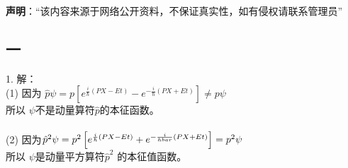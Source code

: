 
\textbf{声明}：“该内容来源于网络公开资料，不保证真实性，如有侵权请联系管理员”


\subsection{一}
1. 解：\\
(1) 因为 $\hat{p} \psi = p\left[e^{\frac{i}{\hbar}(PX - Et)} - e^{-\frac{i}{\hbar}(PX + Et)}\right] \neq p\psi$\\
所以 $\psi$不是动量算符$\hat{p}$的本征函数。\\\\
(2) 因为$\hat{p}^2 \psi = p^2\left[e^{\frac{i}{\hbar}(PX - Et)} + e^{-\frac{i}{\\hbar}(PX + Et)}\right] = p^2\psi$ \\
所以 $\psi$是动量平方算符$\hat{p}^2$ 的本征值函数。 


